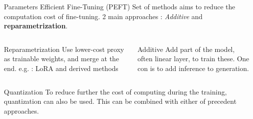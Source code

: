\begin{frame}{Parameters Efficient Fine-Tuning (PEFT)}
    Set of methods aims to reduce the computation cost of fine-tuning. 2 main approaches : \textit{Additive} and \textbf{reparametrization}.
    
    \begin{columns}  
  
        \begin{column}[t]{0.45\textwidth}
        \begin{block}{Reparametrization}
            Use lower-cost proxy as trainable weights, and merge at the end. e.g. : LoRA and derived methods
        \end{block}
        \end{column}
    
        \begin{column}[t]{0.45\textwidth}
        \begin{block}{Additive}
            Add part of the model, often linear layer, to train these.  One con is to add inference to generation.
            
        \end{block}
        \end{column}
      
    \end{columns}

    \begin{block}{Quantization}
        To reduce further the cost of computing during the training, quantization can also be used. This can be combined with either of precedent approaches. 
        
    \end{block}

\end{frame}



